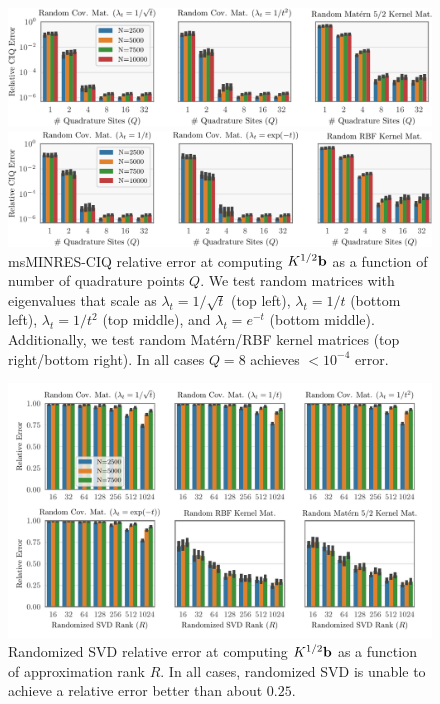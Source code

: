 \begin{figure}[t!]
	\centering
	\includegraphics[width=\textwidth]{figures/quad_error.pdf}

	\includegraphics[width=\textwidth]{figures/quad_error_supp.pdf}
  \caption[
    Relative error of msMINRES-CIQ as a function of number of quadrature points $Q$.
  ]{
    msMINRES-CIQ relative error at computing $\bK^{1/2} \bb$ as a function of number of quadrature points $Q$.
    We test random matrices with eigenvalues that scale as $\lambda_t = 1/\sqrt{t}$ (top left), $\lambda_t = 1/t$ (bottom left), $\lambda_t = 1/{t}^2$ (top middle), and $\lambda_t = e^{-t}$ (bottom middle).
    Additionally, we test random Mat\'ern/RBF kernel matrices (top right/bottom right).
    In all cases $Q=8$ achieves $<10^{-4}$ error.
  }
  \label{fig:quad_error}
\end{figure}

\begin{figure}[ht!]
	\centering
	\includegraphics[width=\textwidth]{figures/randomized_svd_error_supp.pdf}
  \caption[
    Randomized SVD relative error at computing $\bK^{1/2} \bb$.
  ]{
    Randomized SVD relative error at computing $\bK^{1/2} \bb$ as a function of approximation rank $R$.
    In all cases, randomized SVD is unable to achieve a relative error better than about $0.25$.
  }
  \label{fig:randomized_svd_supp}
\end{figure}

